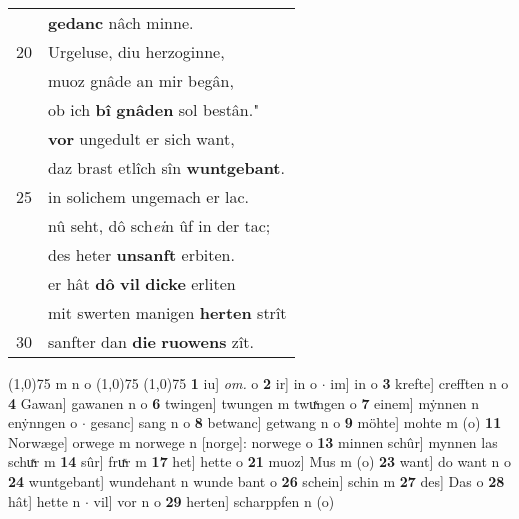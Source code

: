 \documentclass[8pt,a4paper,notitlepage]{article}
\begin{document}
\begin{table}[ht]
\begin{minipage}[t]{0.5\linewidth}
\begin{tabular}{rl}
 & \textbf{gedanc} nâch minne.\\ 
20 & Urgeluse, diu herzoginne,\\ 
 & muoz gnâde an mir begân,\\ 
 & ob ich \textbf{bî} \textbf{gnâden} sol bestân."\\ 
 & \textbf{vor} ungedult er sich want,\\ 
 & daz brast etlîch sîn \textbf{wuntgebant}.\\ 
25 & in solichem ungemach er lac.\\ 
 & nû seht, dô sch\textit{ei}n ûf in der tac;\\ 
 & des heter \textbf{unsanft} erbiten.\\ 
 & er hât \textbf{dô} \textbf{vil} \textbf{dicke} erliten\\ 
 & mit swerten manigen \textbf{herten} strît\\ 
30 & sanfter dan \textbf{die} \textbf{ruowens} zît.\\ 
\end{tabular}
\scriptsize
\line(1,0){75} \newline
m n o \newline
\line(1,0){75} \newline
\newline
\line(1,0){75} \newline
\textbf{1} iu] \textit{om.} o \textbf{2} ir] in o  $\cdot$ im] in o \textbf{3} krefte] crefften n o \textbf{4} Gawan] gawanen n o \textbf{6} twingen] twungen m twuͯngen o \textbf{7} einem] mẏnnen n enẏnngen o  $\cdot$ gesanc] sang n o \textbf{8} betwanc] getwang n o \textbf{9} möhte] mohte m (o) \textbf{11} Norwæge] orwege m norwege n [norge]: norwege o \textbf{13} minnen schûr] mynnen las schuͯr m \textbf{14} sûr] fruͯr m \textbf{17} het] hette o \textbf{21} muoz] Mus m (o) \textbf{23} want] do want n o \textbf{24} wuntgebant] wundehant n wunde bant o \textbf{26} schein] schin m \textbf{27} des] Das o \textbf{28} hât] hette n  $\cdot$ vil] vor n o \textbf{29} herten] scharppfen n (o) \newline
\end{minipage}
\end{table}
\newpage
\end{document}
